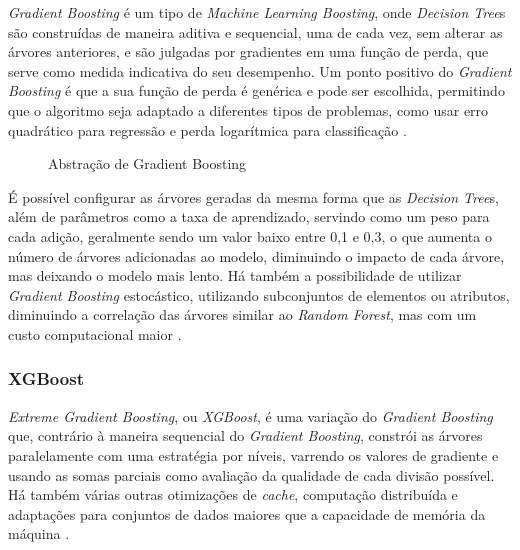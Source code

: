 \textit{Gradient Boosting} é um tipo de \textit{Machine Learning Boosting}, onde \textit{Decision Tree}s são construídas de maneira aditiva e sequencial, uma de cada vez, sem alterar as árvores anteriores, e são julgadas por gradientes em uma função de perda, que serve como medida indicativa do seu desempenho. Um ponto positivo do \textit{Gradient Boosting} é que a sua função de perda é genérica e pode ser escolhida, permitindo que o algoritmo seja adaptado a diferentes tipos de problemas, como usar erro quadrático para regressão e perda logarítmica para classificação \cite{gb-mastery}.

\begin{figure}[ht!]
  \centering
  \caption{\textmd{Abstração de Gradient Boosting}}
  \label{fig:gb-exemplo}
\end{figure}

É possível configurar as árvores geradas da mesma forma que as \textit{Decision Tree}s, além de parâmetros como a taxa de aprendizado, servindo como um peso para cada adição, geralmente sendo um valor baixo entre 0,1 e 0,3, o que aumenta o número de árvores adicionadas ao modelo, diminuindo o impacto de cada árvore, mas deixando o modelo mais lento. Há também a possibilidade de utilizar \textit{Gradient Boosting} estocástico, utilizando subconjuntos de elementos ou atributos, diminuindo a correlação das árvores similar ao \textit{Random Forest}, mas com um custo computacional maior \cite{gb-mastery}.

\subsubsection{XGBoost}
\label{subsubsec:contexto-xgboost}

\textit{Extreme Gradient Boosting}, ou \textit{XGBoost}, é uma variação do \textit{Gradient Boosting} que, contrário à maneira sequencial do \textit{Gradient Boosting}, constrói as árvores paralelamente com uma estratégia por níveis, varrendo os valores de gradiente e usando as somas parciais como avaliação da qualidade de cada divisão possível. Há também várias outras otimizações de \textit{cache}, computação distribuída e adaptações para conjuntos de dados maiores que a capacidade de memória da máquina \cite{xgboost}.

